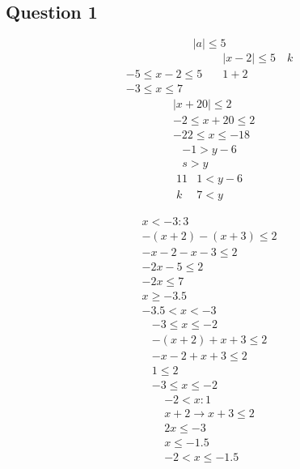 \documentclass[12pt]{article}
\begin{document}


\subsection*{Question 1}

\[
|a| \leq 5
\]
\[
\begin{aligned}
& |x-2| \leq 5 \quad k \\
-5 \leq x-2 \leq 5 \quad & 1+2 \\
-3 \leq x \leq 7 &
\end{aligned}
\]
\[
\begin{aligned}
& |x+20| \leq 2 \\
& -2 \leq x+20 \leq 2 \\
& -22 \leq x \leq-18
\end{aligned}
\]
\[
\begin{gathered}
-1>y-6 \\
s>y
\end{gathered}
\]
\[
\begin{array}{ll}
11 & 1<y-6 \\
k & 7<y
\end{array}
\]

\[
\begin{gathered}
x<-3: 3 \\
-(x+2)-(x+3) \leq 2 \\
-x-2-x-3 \leq 2 \\
-2 x-5 \leq 2 \\
-2 x \leq 7 \\
x \geq-3.5 \\
-3.5<x<-3
\end{gathered}
\]
\[
\begin{gathered}
-3 \leq x \leq-2 \\
-(x+2)+x+3 \leq 2 \\
-x-2+x+3 \leq 2 \\
1 \leq 2 \\
-3 \leq x \leq-2
\end{gathered}
\]
\[
\begin{gathered}
-2<x: 1 \\
x+2 \rightarrow x+3 \leq 2 \\
2 x \leq-3 \\
x \leq-1.5 \\
-2<x \leq-1.5
\end{gathered}
\]
\end{document}
